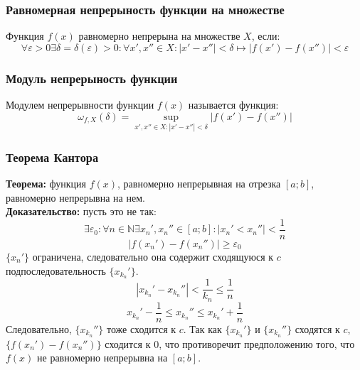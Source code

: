 \documentclass{article}
\newcommand{\theorem}{\textbf{Теорема:} }
\newcommand{\proof}{\textbf{Доказательство:} }
\newcommand{\seq}[1]{$\{#1\}$}
\newcommand{\otr}[2]{$[#1;#2]$}
\begin{document}
        \subsubsection*{Равномерная непрерыность функции на множестве}
        Функция $f(x)$ равномерно непрерына на множестве $X$, если:
        \[ \forall \varepsilon > 0 \exists \delta = \delta(\varepsilon) > 0: \forall x', x'' \in X: |x' - x''| < \delta \longmapsto |f(x') - f(x'')| < \varepsilon \]

        \subsubsection*{Модуль непрерыность функции}
        Модулем непрерывности функции $f(x)$ называется функция:
        \[ \omega_{f,X}(\delta) = \sup_{x', x'' \in X: |x' - x''| < \delta} |f(x') - f(x'')| \]
        
        \subsubsection*{Теорема Кантора}
        \theorem функция $f(x)$, равномерно непрерывная на отрезка \otr{a}{b}, равномерно непрерывна на нем.
        \\
        \proof пусть это не так:
        \[ \exists \varepsilon_0: \forall n \in \mathbb{N} \exists x_n', x_n'' \in [a;b]: |x_n' < x_n''| < \frac{1}{n} \]
        \[ | f(x_n') - f(x_n'') | \ge \varepsilon_0 \]
        \seq{x_n'} ограничена, следовательно она содержит сходящуюся к $c$ подпоследовательность \seq{x_{k_n}'}.
        \[ \left| x_{k_n}' - x_{k_n}'' \right| < \frac{1}{k_n} \le \frac{1}{n} \]
        \[ x_{k_n}' - \frac{1}{n} \le x_{k_n}'' \le x_{k_n}' + \frac{1}{n} \]
        Следовательно, \seq{x_{k_n}''} тоже сходится к $c$. Так как \seq{x_{k_n}'} и \seq{x_{k_n}''} сходятся к $c$,
        \seq{f(x_n') - f(x_n'')} сходится к $0$, что противоречит предположению того, что $f(x)$ не равномерно непрерывна на $[a;b]$.
\end{document}
